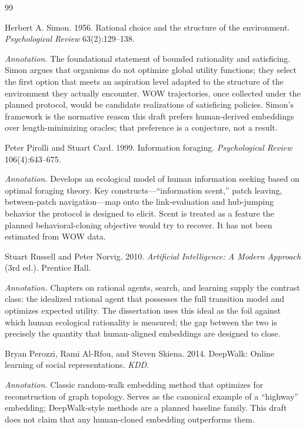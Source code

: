 \documentclass[11pt,a4paper]{report}
\begin{document}
\begin{thebibliography}{99}

Herbert A. Simon. 1956. Rational choice and the structure of the environment. \textit{Psychological Review} 63(2):129--138.

\textit{Annotation.} The foundational statement of bounded rationality and satisficing. Simon argues that organisms do not optimize global utility functions; they select the first option that meets an aspiration level adapted to the structure of the environment they actually encounter. WOW trajectories, once collected under the planned protocol, would be candidate realizations of satisficing policies. Simon’s framework is the normative reason this draft prefers human-derived embeddings over length-minimizing oracles; that preference is a conjecture, not a result.

Peter Pirolli and Stuart Card. 1999. Information foraging. \textit{Psychological Review} 106(4):643--675.

\textit{Annotation.} Develops an ecological model of human information seeking based on optimal foraging theory. Key constructs—“information scent,” patch leaving, between-patch navigation—map onto the link-evaluation and hub-jumping behavior the protocol is designed to elicit. Scent is treated as a feature the planned behavioral-cloning objective would try to recover. It has not been estimated from WOW data.

Stuart Russell and Peter Norvig. 2010. \textit{Artificial Intelligence: A Modern Approach} (3rd ed.). Prentice Hall.

\textit{Annotation.} Chapters on rational agents, search, and learning supply the contrast class: the idealized rational agent that possesses the full transition model and optimizes expected utility. The dissertation uses this ideal as the foil against which human ecological rationality is measured; the gap between the two is precisely the quantity that human-aligned embeddings are designed to close.

Bryan Perozzi, Rami Al-Rfou, and Steven Skiena. 2014. DeepWalk: Online learning of social representations. \textit{KDD}.

\textit{Annotation.} Classic random-walk embedding method that optimizes for reconstruction of graph topology. Serves as the canonical example of a “highway” embedding; DeepWalk-style methods are a planned baseline family. This draft does not claim that any human-cloned embedding outperforms them.


\end{thebibliography}
\end{document}
